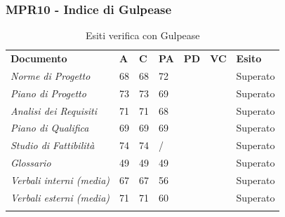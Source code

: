 \subsubsection{MPR10 - Indice di Gulpease}
\begin{center}
    \centering
    \renewcommand{\arraystretch}{1.8}
    \label{tab:IndiciGulpease}
    \begin{longtable}[!h]{p{100px} p{50px} p{50px} p{50px} p{50px} p{50px} p{50px}}
        \caption{Esiti verifica con Gulpease}                                                                                        \\
        \rowcolor{logo!70}   \textbf{Documento} & \textbf{A} & \textbf{C} & \textbf{PA} & \textbf{PD} & \textbf{VC} & \textbf{Esito} \\
        \textit{Norme di Progetto}              & 68         & 68         & 72          &            &             & Superato       \\
        \textit{Piano di Progetto}              & 73         & 73         & 69           &            &              & Superato       \\
        \textit{Analisi dei Requisiti}          & 71         & 71         & 68          &            &           & Superato       \\
        \textit{Piano di Qualifica}             & 69         & 69         & 69           &            &            & Superato       \\
        \textit{Studio di Fattibilità}          & 74         & 74         & /           &            &            & Superato       \\
        \textit{Glossario}                      & 49         & 49         & 49           &           &           & Superato       \\
        \textit{Verbali interni (media)}        & 67         & 67         & 56           &           &           & Superato       \\
        \textit{Verbali esterni (media)}        & 71         & 71         & 60           &           &            & Superato       \\
        \rowcolor{white}
    \end{longtable}
\end{center}
